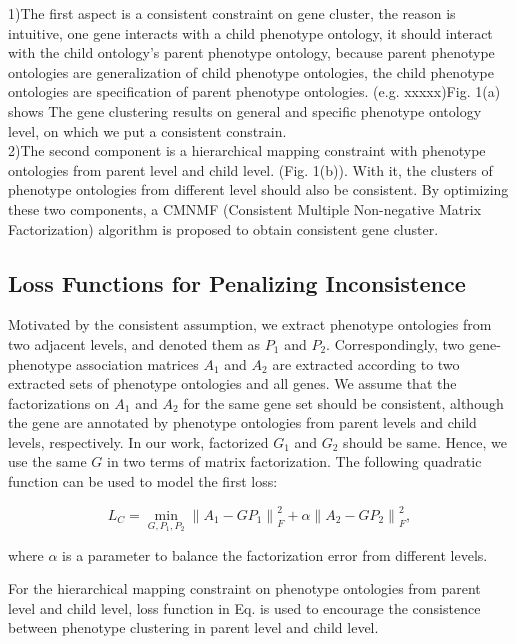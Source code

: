 \documentclass{bmcart}
\begin{document}
1)The first aspect is a consistent constraint on gene cluster, the reason is intuitive, one gene interacts with a child phenotype ontology, it should interact with the child ontology's parent phenotype ontology, because parent phenotype ontologies are generalization of child phenotype ontologies, the child phenotype ontologies are specification of parent phenotype ontologies. (e.g. xxxxx)Fig. 1(a) shows The gene clustering results on general and specific phenotype ontology level, on which we put a consistent constrain.\\
2)The second component is a hierarchical mapping constraint with phenotype ontologies from parent level and child level. (Fig. 1(b)). With it, the clusters of phenotype ontologies from different level should also be consistent. By optimizing these two components, a CMNMF (Consistent Multiple Non-negative Matrix Factorization) algorithm is proposed to obtain consistent gene cluster.



\subsection*{Loss Functions for Penalizing Inconsistence}

Motivated by the consistent assumption, we extract phenotype ontologies from two adjacent levels, and denoted them as $P_{1}$ and $P_{2}$. Correspondingly, two gene-phenotype association matrices $A_{1}$ and $A_{2}$ are extracted according to two extracted sets of phenotype ontologies and all genes. We assume that the factorizations on  $A_{1}$ and $A_{2}$ for the same gene set should be consistent, although the gene are annotated by phenotype ontologies from parent levels and child levels, respectively. In our work, factorized $G_{1}$ and $G_{2}$ should be same. Hence, we use the same $G$ in two terms of matrix factorization. The following quadratic function can be used to model the first loss:

\begin{equation}
{L_C} = \mathop {\min }\limits_{G,{P_1},{P_2}} \left\| {{A_1} - G{P_1}} \right\|_F^2 + \alpha \left\| {{A_2} - G{P_2}} \right\|_F^2,
\end{equation}

where $\alpha$ is a parameter to balance the factorization error from different levels.

For the hierarchical mapping constraint on phenotype ontologies from parent level and child level, loss function in Eq. is used to encourage the consistence between phenotype clustering in parent level and child level.
\end{document}
